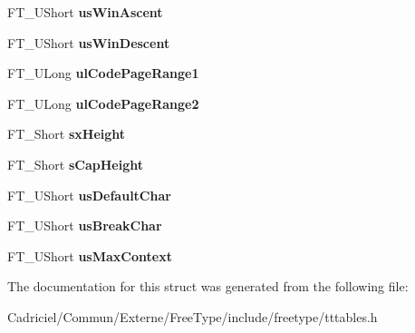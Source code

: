 \begin{DoxyCompactItemize}
\item 
\hypertarget{struct_t_t___o_s2___aeb85b76e77753e4b59945550bdd098a1}{F\-T\-\_\-\-U\-Short {\bfseries us\-Win\-Ascent}}\label{struct_t_t___o_s2___aeb85b76e77753e4b59945550bdd098a1}

\item 
\hypertarget{struct_t_t___o_s2___a573ace3da03efa98a716a8443e4d0084}{F\-T\-\_\-\-U\-Short {\bfseries us\-Win\-Descent}}\label{struct_t_t___o_s2___a573ace3da03efa98a716a8443e4d0084}

\item 
\hypertarget{struct_t_t___o_s2___a0b5a2875c21d20e5a5b5f3641ddb29fc}{F\-T\-\_\-\-U\-Long {\bfseries ul\-Code\-Page\-Range1}}\label{struct_t_t___o_s2___a0b5a2875c21d20e5a5b5f3641ddb29fc}

\item 
\hypertarget{struct_t_t___o_s2___ad117c64d73d15d1304c75fb5f41f1124}{F\-T\-\_\-\-U\-Long {\bfseries ul\-Code\-Page\-Range2}}\label{struct_t_t___o_s2___ad117c64d73d15d1304c75fb5f41f1124}

\item 
\hypertarget{struct_t_t___o_s2___a2eb3bb1392461a536c393304bde72835}{F\-T\-\_\-\-Short {\bfseries sx\-Height}}\label{struct_t_t___o_s2___a2eb3bb1392461a536c393304bde72835}

\item 
\hypertarget{struct_t_t___o_s2___ac755913b648d535d1207927e4a6f1ec0}{F\-T\-\_\-\-Short {\bfseries s\-Cap\-Height}}\label{struct_t_t___o_s2___ac755913b648d535d1207927e4a6f1ec0}

\item 
\hypertarget{struct_t_t___o_s2___af8639fefeb705a9287df996b224462ea}{F\-T\-\_\-\-U\-Short {\bfseries us\-Default\-Char}}\label{struct_t_t___o_s2___af8639fefeb705a9287df996b224462ea}

\item 
\hypertarget{struct_t_t___o_s2___a1d47030e246d2593ec3e4cdf66b17161}{F\-T\-\_\-\-U\-Short {\bfseries us\-Break\-Char}}\label{struct_t_t___o_s2___a1d47030e246d2593ec3e4cdf66b17161}

\item 
\hypertarget{struct_t_t___o_s2___a167313e407c77db2c4ca5a987f3a1482}{F\-T\-\_\-\-U\-Short {\bfseries us\-Max\-Context}}\label{struct_t_t___o_s2___a167313e407c77db2c4ca5a987f3a1482}

\end{DoxyCompactItemize}


The documentation for this struct was generated from the following file\-:\begin{DoxyCompactItemize}
\item 
Cadriciel/\-Commun/\-Externe/\-Free\-Type/include/freetype/tttables.\-h\end{DoxyCompactItemize}
